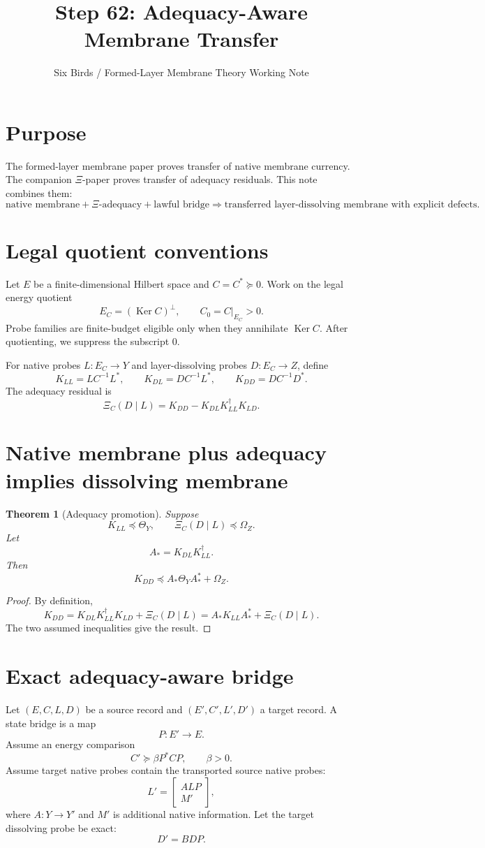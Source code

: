 \documentclass[11pt]{article}
\title{Step 62: Adequacy-Aware Membrane Transfer}
\author{Six Birds / Formed-Layer Membrane Theory Working Note}
\date{}
\newtheorem{theorem}{Theorem}
\newcommand{\Null}{\operatorname{Ker}}
\newcommand{\pre}{\preceq}
\begin{document}
\maketitle

\section{Purpose}
The formed-layer membrane paper proves transfer of native membrane currency.  The companion $\Xi$-paper proves transfer of adequacy residuals.  This note combines them:
\[
\text{native membrane}+\Xi\text{-adequacy}+\text{lawful bridge}
\Longrightarrow
\text{transferred layer-dissolving membrane with explicit defects}.
\]

\section{Legal quotient conventions}
Let $E$ be a finite-dimensional Hilbert space and $C=C^*\succeq0$.  Work on the legal energy quotient
\[
E_C=(\Null C)^\perp,
\qquad
C_0=C|_{E_C}>0.
\]
Probe families are finite-budget eligible only when they annihilate $\Null C$.  After quotienting, we suppress the subscript $0$.

For native probes $L:E_C\to Y$ and layer-dissolving probes $D:E_C\to Z$, define
\[
K_{LL}=LC^{-1}L^*,\qquad
K_{DL}=DC^{-1}L^*,\qquad
K_{DD}=DC^{-1}D^*.
\]
The adequacy residual is
\[
\boxed{
\Xi_C(D\mid L)=K_{DD}-K_{DL}K_{LL}^{\dagger}K_{LD}.
}
\]

\section{Native membrane plus adequacy implies dissolving membrane}

\begin{theorem}[Adequacy promotion]
Suppose
\[
K_{LL}\pre \Theta_Y,
\qquad
\Xi_C(D\mid L)\pre \Omega_Z.
\]
Let
\[
A_*=K_{DL}K_{LL}^{\dagger}.
\]
Then
\[
\boxed{
K_{DD}\pre A_*\Theta_YA_*^*+\Omega_Z.
}
\]
\end{theorem}

\begin{proof}
By definition,
\[
K_{DD}=K_{DL}K_{LL}^{\dagger}K_{LD}+\Xi_C(D\mid L)
=A_*K_{LL}A_*^*+\Xi_C(D\mid L).
\]
The two assumed inequalities give the result.
\end{proof}

\section{Exact adequacy-aware bridge}
Let $(E,C,L,D)$ be a source record and $(E',C',L',D')$ a target record.  A state bridge is a map
\[
P:E'\to E.
\]
Assume an energy comparison
\[
C'\succeq \beta P^*CP,
\qquad \beta>0.
\]
Assume target native probes contain the transported source native probes:
\[
L'=\begin{bmatrix}ALP\\M'\end{bmatrix},
\]
where $A:Y\to Y'$ and $M'$ is additional native information.  Let the target dissolving probe be exact:
\[
D'=BDP.
\]
\end{document}
